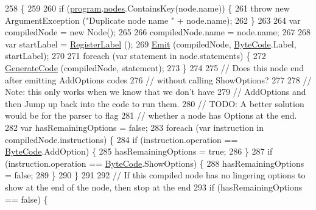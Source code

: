 \begin{DoxyCode}
258                                                     \{
259 
260             \textcolor{keywordflow}{if} (\hyperlink{a00043_aa1737da428ec7d597009661dd8a47829}{program}.\hyperlink{a00081_a3f4928a577c88263ad016be259b175c4}{nodes}.ContainsKey(node.name)) \{
261                 \textcolor{keywordflow}{throw} \textcolor{keyword}{new} ArgumentException (\textcolor{stringliteral}{"Duplicate node name "} + node.name);
262             \}
263 
264             var compiledNode =  \textcolor{keyword}{new} Node();
265 
266             compiledNode.name = node.name;
267 
268             var startLabel = \hyperlink{a00043_a1bae0d8b701a59708641aa36ea971fa5}{RegisterLabel} ();
269             \hyperlink{a00043_a774e8c143cdda0584fcfdda98626a83c}{Emit} (compiledNode, \hyperlink{a00040_ad5dfb6ee68ca7469623ad3e459f98894}{ByteCode}.Label, startLabel);
270 
271             \textcolor{keywordflow}{foreach} (var statement \textcolor{keywordflow}{in} node.statements) \{
272                 \hyperlink{a00043_a006f3becd521cc179ba3d3352f6f930b}{GenerateCode} (compiledNode, statement);
273             \}
274 
275             \textcolor{comment}{// Does this node end after emitting AddOptions codes}
276             \textcolor{comment}{// without calling ShowOptions?}
277 
278             \textcolor{comment}{// Note: this only works when we know that we don't have}
279             \textcolor{comment}{// AddOptions and then Jump up back into the code to run them.}
280             \textcolor{comment}{// TODO: A better solution would be for the parser to flag}
281             \textcolor{comment}{// whether a node has Options at the end.}
282             var hasRemainingOptions = \textcolor{keyword}{false};
283             \textcolor{keywordflow}{foreach} (var instruction \textcolor{keywordflow}{in} compiledNode.instructions) \{
284                 \textcolor{keywordflow}{if} (instruction.operation == \hyperlink{a00040_ad5dfb6ee68ca7469623ad3e459f98894}{ByteCode}.AddOption) \{
285                     hasRemainingOptions = \textcolor{keyword}{true};
286                 \}
287                 \textcolor{keywordflow}{if} (instruction.operation == \hyperlink{a00040_ad5dfb6ee68ca7469623ad3e459f98894}{ByteCode}.ShowOptions) \{
288                     hasRemainingOptions = \textcolor{keyword}{false};
289                 \}
290             \}
291 
292             \textcolor{comment}{// If this compiled node has no lingering options to show at the end of the node, then stop at
       the end}
293             \textcolor{keywordflow}{if} (hasRemainingOptions == \textcolor{keyword}{false}) \{

\end{DoxyCode}
